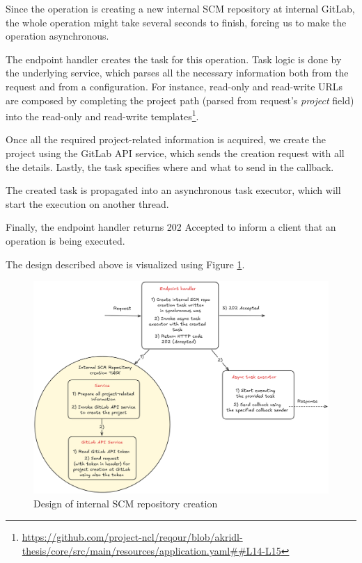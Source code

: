 \documentclass[./main.tex]{subfiles}
\begin{document}
Since the operation is creating a new internal SCM repository at internal GitLab, the whole operation might take several seconds to finish, forcing us to make the operation asynchronous.

The endpoint handler creates the task for this operation. Task logic is done by the underlying service, which parses all the necessary information both from the request and from a configuration. For instance, read-only and read-write URLs are composed by completing the project path (parsed from request's \textit{project} field) into the read-only and read-write templates\footnote{\url{https://github.com/project-ncl/reqour/blob/akridl-thesis/core/src/main/resources/application.yaml##L14-L15}}.

Once all the required project-related information is acquired, we create the project using the GitLab API service, which sends the creation request with all the details. Lastly, the task specifies where and what to send in the callback.

The created task is propagated into an asynchronous task executor, which will start the execution on another thread.

Finally, the endpoint handler returns 202 Accepted to inform a client that an operation is being executed.

The design described above is visualized using Figure \ref{fig:internal-scm-design}.

\begin{figure}
  \begin{center}
    \includegraphics[width=\textwidth]{images/internal-scm-design.png}
  \end{center}
  \caption{Design of internal SCM repository creation}
  \label{fig:internal-scm-design}
\end{figure}
\end{document}
